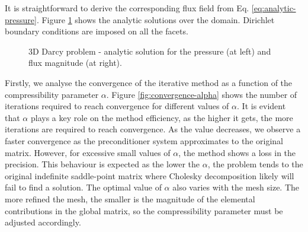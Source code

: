 \documentclass{wccm2024}
\begin{document}
It is straightforward to derive the corresponding flux field from Eq. \eqref{eq:analytic-pressure}. Figure \ref{fig:analytic-solutions} shows the analytic solutions over the domain. Dirichlet boundary conditions are imposed on all the facets.

\begin{figure}[!ht]
    \centering
     \hfill
    \caption{3D Darcy problem - analytic solution for the pressure (at left) and flux magnitude (at right).}
    \label{fig:analytic-solutions}
\end{figure}

Firstly, we analyse the convergence of the iterative method as a function of the compressibility parameter $\alpha$. Figure \ref{fig:convergence-alpha} shows the number of iterations required to reach convergence for different values of $\alpha$. It is evident that $\alpha$ plays a key role on the method efficiency, as the higher it gets, the more iterations are required to reach convergence. As the value decreases, we observe a faster convergence as the preconditioner system approximates to the original matrix. However, for excessive small values of $\alpha$, the method shows a loss in the precision. This behaviour is expected as the lower the $\alpha$, the problem tends to the original indefinite saddle-point matrix where Cholesky decomposition likely will fail to find a solution. The optimal value of $\alpha$ also varies with the mesh size. The more refined the mesh, the smaller is the magnitude of the elemental contributions in the global matrix, so the compressibility parameter must be adjusted accordingly.
\end{document}

